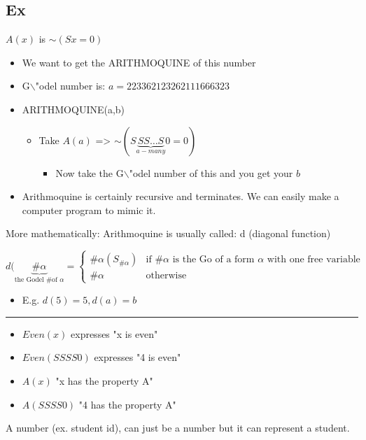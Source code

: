 \documentclass[11pt]{article}
\begin{document}
\subsection{Ex}
\label{sec:orgdd99f0c}
\(A(x)\) is \(\sim (Sx=0)\)
\begin{itemize}
\item We want to get the ARITHMOQUINE of this number
\item G$\backslash$"odel number is: \(a = 223 362 123 262 111 666 323\)
\item ARITHMOQUINE(a,b)
\begin{itemize}
\item Take \(A(a)\) => \(\sim (S\underbrace{SS \ldots S}_{a-many}0 = 0)\)
\begin{itemize}
\item Now take the G$\backslash$"odel number of this and you get your \(b\)
\end{itemize}
\end{itemize}
\item Arithmoquine is certainly recursive and terminates. We can easily make a computer program to mimic it.
\end{itemize}
More mathematically: Arithmoquine is usually called: d (diagonal function)

\begin{equation*}
d(\underbrace{\#\alpha}_{\text{the Godel \# of $\alpha$}} =
\begin{cases}
\#\alpha (S_{\#\alpha}) & \text{if $\#\alpha$ is the Go of a form $\alpha$ with one free variable}
\\ \#\alpha & \text{otherwise}
\end{cases}
\end{equation*}
\begin{itemize}
\item E.g. \(d(5) = 5, d(a)=b\)
\end{itemize}

\noindent\rule{\textwidth}{0.5pt}
\begin{itemize}
\item \(Even (x)\) expresses "x is even"
\item \(Even (SSSS0)\) expresses "4 is even"
\item \(A(x)\) "x has the property A"
\item \(A(SSSS0)\) "4 has the property A"
\end{itemize}

A number (ex. student id), can just be a number but it can represent a student.
\end{document}
